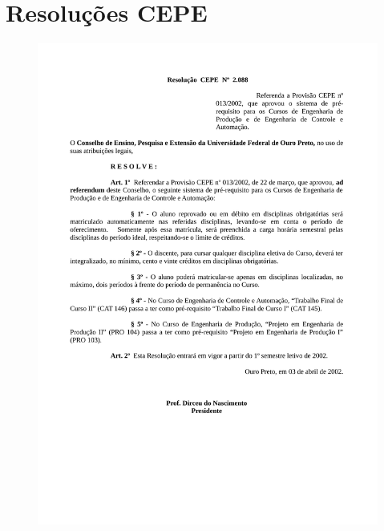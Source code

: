 \chapter{Resoluções CEPE} 
\label{ape:02} 
\begin{figure}[p]
	\centering 
	\includegraphics[scale=0.7]{capitulos/resolucoes-cepe/cepe2088.pdf}
\end{figure}

